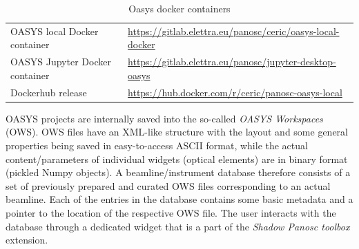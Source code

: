 \documentclass[10pt]{scrartcl}
\begin{document}
\begin{table}[ht]
  \label{tab:oasys_containers}
  \centering
  \begin{center}
    \caption{Oasys docker containers}
    \begin{tabular}{ll}
      \hline
      OASYS local Docker container & \url{https://gitlab.elettra.eu/panosc/ceric/oasys-local-docker} \\
      OASYS Jupyter Docker container & \url{https://gitlab.elettra.eu/panosc/jupyter-desktop-oasys} \\
      Dockerhub release & \url{https://hub.docker.com/r/ceric/panosc-oasys-local}\\
      \hline
    \end{tabular}
  \end{center}
\end{table}
% 
OASYS projects are internally saved into the so-called \emph{OASYS Workspaces} (OWS). OWS files have an XML-like structure with the layout and some general properties being saved in easy-to-access ASCII format, while the actual content/parameters of individual widgets (optical elements) are in binary format (pickled Numpy objects). A beamline/instrument database therefore consists of a set of previously prepared and curated OWS files corresponding to an actual beamline. Each of the entries in the database contains some basic metadata and a pointer to the location of the respective OWS file. The user interacts with the database through a dedicated widget that is a part of the \emph{Shadow Panosc toolbox} extension.
\end{document}
